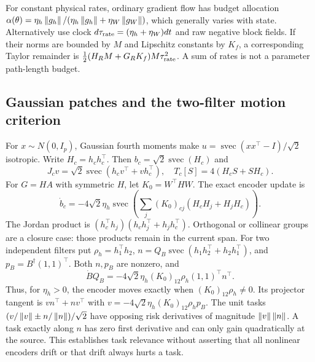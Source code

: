 For constant physical rates, ordinary gradient flow has budget allocation $\alpha(\theta)=\eta_h\left\lVert g_h\right\rVert/(\eta_h\left\lVert g_h\right\rVert+\eta_W\left\lVert g_W\right\rVert)$, which generally varies with state. Alternatively use clock $d\tau_{\rm rate}=(\eta_h+\eta_W)dt$ and raw negative block fields. If their norms are bounded by $M$ and Lipschitz constants by $K_f$, a corresponding Taylor remainder is $\tfrac12(H_RM+G_RK_f)M\tau_{\rm rate}^2$. A sum of rates is not a parameter path-length budget.

\subsection{Gaussian patches and the two-filter motion criterion}
For $x\sim N(0,I_p)$, Gaussian fourth moments make $u=\operatorname{svec}(xx^\top-I)/\sqrt2$ isotropic. Write $H_c=h_ch_c^\top$. Then $b_c=\sqrt2\operatorname{svec}(H_c)$ and
\begin{equation}
 J_cv=\sqrt2\operatorname{svec}(h_cv^\top+vh_c^\top),
 \quad T_c[S]=4(H_cS+SH_c).
\end{equation}
For $G=HA$ with symmetric $H$, let $K_0=W^\top HW$. The exact encoder update is
\begin{equation}
 \dot b_c=-4\sqrt2\eta_h\operatorname{svec}
 \left(\sum_j(K_0)_{cj}(H_cH_j+H_jH_c)\right).
\end{equation}
The Jordan product is $(h_c^\top h_j)(h_ch_j^\top+h_jh_c^\top)$. Orthogonal or collinear groups are a closure case: those products remain in the current span. For two independent filters put $\rho_h=h_1^\top h_2$, $n=Q_B\operatorname{svec}(h_1h_2^\top+h_2h_1^\top)$, and $p_B=B^\dagger(1,1)^\top$. Both $n,p_B$ are nonzero, and
\begin{equation}
 \dot BQ_B=-4\sqrt2\eta_h(K_0)_{12}\rho_h(1,1)^\top n^\top.
\end{equation}
Thus, for $\eta_h>0$, the encoder moves exactly when $(K_0)_{12}\rho_h\ne0$. Its projector tangent is $vn^\top+nv^\top$ with $v=-4\sqrt2\eta_h(K_0)_{12}\rho_hp_B$. The unit tasks $(v/\left\lVert v\right\rVert\pm n/\left\lVert n\right\rVert)/\sqrt2$ have opposing risk derivatives of magnitude $\left\lVert v\right\rVert\left\lVert n\right\rVert$. A task exactly along $n$ has zero first derivative and can only gain quadratically at the source. This establishes task relevance without asserting that all nonlinear encoders drift or that drift always hurts a task.

